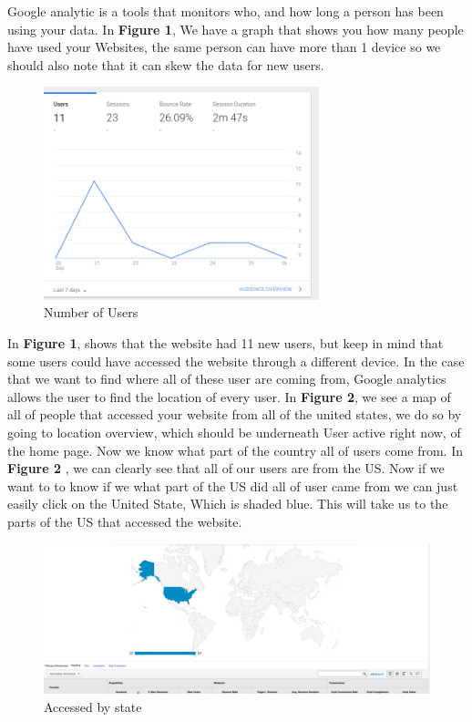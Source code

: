 \documentclass{article}
\begin{document}
Google analytic is a tools that monitors who, and how long a person has been using your data. In \textbf{Figure 1}, We have a graph that shows you how many people have used your Websites,  the same person can have more than 1 device so we should also note that it can skew the data for new users.
\begin{figure}[h!]
\includegraphics[width=8cm]{users}
\centering
\caption{Number of Users}
\end{figure}
In \textbf{Figure 1}, shows that the website had 11 new users, but keep in mind that some users could have accessed the website through a different device. In the case that we want to find where all of these user are coming from, Google analytics allows the user to find the location of every user. In \textbf{Figure 2}, we see a map of all of people that accessed your website from all of the united states, we do so by going to location overview, which should be underneath User active right now, of the home page. Now we know what part of the country all of users come from. In \textbf{Figure 2 }, we can clearly see that all of our users are from the US. Now if we want to to know if we what part of the US did all of user came from we can just easily click on the United State, Which is shaded blue. This will take us to the parts of the US that accessed the website.
\begin{figure}[h!]
\includegraphics[scale = .5]{places.png}
\centering
\caption{Accessed by state }
\end{figure}
\end{document}
